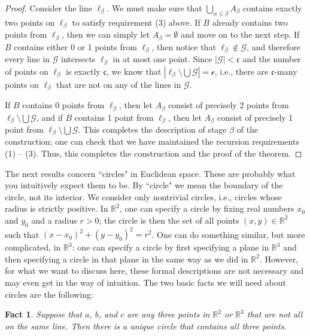 \documentclass[a4paper]{memoir}
\newtheorem{fact}[theorem]{Fact}
\theoremstyle{definition}
\newcommand{\bb}{\mathbb}
\begin{document}
\begin{proof}
  Consider the line $\ell_\beta$. We must make sure that $\bigcup_{\alpha \leq \beta} A_\beta$ 
  contains exactly two points on $\ell_\beta$ to satisfy requirement (3) above. 
  If $B$ already contains two points from $\ell_\beta$, then we can simply let $A_\beta = \emptyset$ 
  and move on to the next step. If $B$ contains either 0 or 1 points from $\ell_\beta$, then notice 
  that $\ell_\beta \notin \mathcal{G}$, and therefore every line in $\mathcal{G}$ intersects 
  $\ell_\beta$ in at most one point. Since $|\mathcal{G}| < \mathfrak{c}$ and the number of points 
  on $\ell_\beta$ is exactly $\mathfrak{c}$, we know that $|\ell_\beta \setminus \bigcup 
  \mathcal{G}| = \mathcal{c}$, i.e., there are $\mathfrak{c}$-many points on $\ell_\beta$ that 
  are not on any of the lines in $\mathcal{G}$. 
  
  If $B$ contains 0 points from $\ell_\beta$, then let $A_\beta$ consist of precisely 2 points 
  from $\ell_\beta \setminus \bigcup \mathcal{G}$, and if $B$ contains 1 point from $\ell_\beta$, 
  then let $A_\beta$ consist of precisely 1 point from $\ell_\beta \setminus \bigcup \mathcal{G}$. 
  This completes the description of stage $\beta$ of the construction; one can check that we have 
  maintained the recursion requirements (1) -- (3). Thus, this completes the construction and 
  the proof of the theorem.
\end{proof}

The next results concern ``circles" in Euclidean space. These are probably what you intuitively 
expect them to be. By ``circle" we mean the boundary of the circle, not its interior. We consider 
only nontrivial circles, i.e., circles whose radius is strictly positive. In 
$\mathbb{R}^2$, one can specify a circle by fixing real numbers $x_0$ and $y_0$ and a radius 
$r > 0$; the circle is then the set of all points $(x,y) \in \bb{R}^2$ such that 
$(x-x_0)^2 + (y - y_0)^2 = r^2$. One can do something similar, but more complicated, in 
$\bb{R}^3$: one can specify a circle by first specifying a plane in $\bb{R}^3$ and then specifying 
a circle in that plane in the same way as we did in $\bb{R}^2$. However, for what we want to 
discuss here, these formal descriptions are not necessary and may even get in the way of intuition. 
The two basic facts we will need about circles are the following:

\begin{fact}
  Suppose that $a$, $b$, and $c$ are any three points in $\bb{R}^2$ or $\bb{R}^3$ that are not 
  all on the same line. Then there is a unique circle that contains all three points.
\end{fact}
\end{document}
